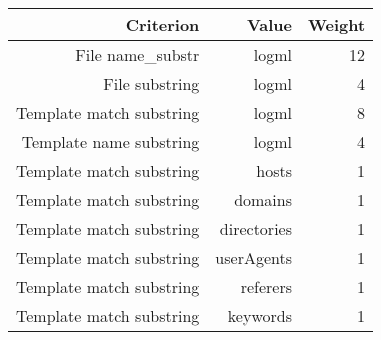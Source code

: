 \begin{tabular}{|r|r|r|}
\hline
\bf Criterion&\bf Value&\bf Weight\\
\hline
File name_substr&logml&12\\
\hline
File substring&logml&4\\
\hline
Template match substring&logml&8\\
\hline
Template name substring&logml&4\\
\hline
Template match substring&hosts&1\\
\hline
Template match substring&domains&1\\
\hline
Template match substring&directories&1\\
\hline
Template match substring&userAgents&1\\
\hline
Template match substring&referers&1\\
\hline
Template match substring&keywords&1\\
\hline
\end{tabular}
